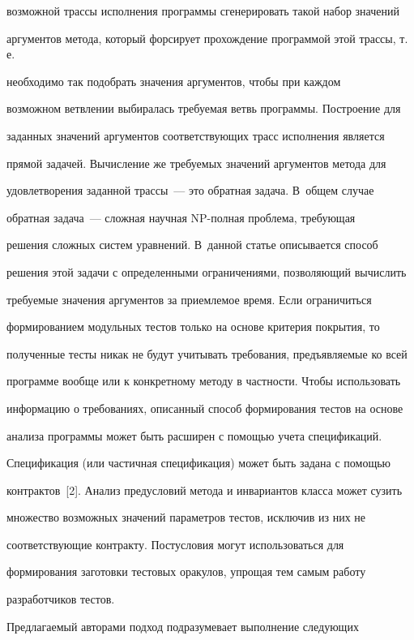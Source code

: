 возможной трассы исполнения программы сгенерировать такой набор значений


аргументов метода, который форсирует прохождение программой этой трассы, т.\,е.\


необходимо так подобрать значения аргументов, чтобы при каж\-дом


возможном ветвлении выбиралась требуемая ветвь программы. Построение для


заданных значений аргументов соответствующих трасс исполнения является


прямой задачей. Вычисление же требуемых значений аргументов метода для


удовле\-тво\-ре\-ния заданной трассы~--- это обратная задача. В~общем случае


обратная задача~--- сложная научная NP-пол\-ная проб\-ле\-ма, требующая


решения сложных систем уравнений. В~данной статье описывается способ


решения этой задачи с определенными ограничениями, позволяющий вычислить


требуемые значения аргументов за приемлемое время. Если ограничиться


формированием модульных тестов только на основе критерия покрытия, то


полученные тесты никак не будут учитывать требования, предъявляемые ко всей


программе вообще или к конкретному методу в частности. Чтобы использовать


информацию о требованиях, описанный способ формирования тестов на основе


анализа программы может быть расширен с помощью учета спецификаций.


Спецификация (или частичная спецификация) может быть задана с помощью


контрактов~[2]. Анализ предусловий метода и инвариантов класса может сузить


множество возможных значений параметров тестов, исключив из них не


соответствующие контракту. Постусловия могут использоваться для


формирования заготовки тестовых оракулов, упрощая тем самым работу


разработчиков тестов.





     Предлагаемый авторами подход подразумевает выполнение следующих


